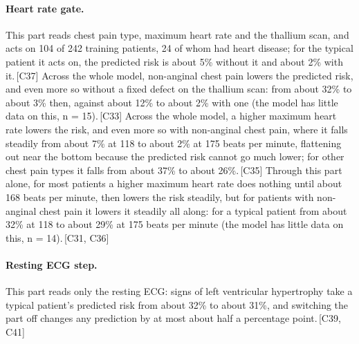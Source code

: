 \documentclass[a4paper,10pt]{article}
\newif\ifreviewmarks
\newcommand{\reviewrule}{\noindent{\color{BrickRed}\rule{\linewidth}{0.8pt}}}
\newenvironment{drafted}[1][]{%
  \ifreviewmarks\par\addvspace{\medskipamount}\reviewrule\par\nopagebreak
  \noindent{\color{BrickRed}\sffamily\footnotesize\textbf{Thesis Draft}\quad #1\hfill review}\par\nopagebreak\smallskip\fi}{%
  \ifreviewmarks\par\smallskip\noindent{\color{BrickRed}\sffamily\footnotesize end of thesis draft}\par\nopagebreak\reviewrule\par\medskip\fi}
\begin{document}
\begin{drafted}[plain-language layer: heart-s2-c2]
\paragraph{Heart rate gate.} This part reads chest pain type, maximum heart rate and the thallium scan, and acts on 104 of 242 training patients, 24 of whom had heart disease; for the typical patient it acts on, the predicted risk is about 5\% without it and about 2\% with it.\,{\scriptsize\textcolor{NavyBlue}{[C37]}} Across the whole model, non-anginal chest pain lowers the predicted risk, and even more so without a fixed defect on the thallium scan: from about 32\% to about 3\% then, against about 12\% to about 2\% with one (the model has little data on this, n = 15).\,{\scriptsize\textcolor{NavyBlue}{[C33]}} Across the whole model, a higher maximum heart rate lowers the risk, and even more so with non-anginal chest pain, where it falls steadily from about 7\% at 118 to about 2\% at 175 beats per minute, flattening out near the bottom because the predicted risk cannot go much lower; for other chest pain types it falls from about 37\% to about 26\%.\,{\scriptsize\textcolor{NavyBlue}{[C35]}} Through this part alone, for most patients a higher maximum heart rate does nothing until about 168 beats per minute, then lowers the risk steadily, but for patients with non-anginal chest pain it lowers it steadily all along: for a typical patient from about 32\% at 118 to about 29\% at 175 beats per minute (the model has little data on this, n = 14).\,{\scriptsize\textcolor{NavyBlue}{[C31, C36]}}
\paragraph{Resting ECG step.} This part reads only the resting ECG: signs of left ventricular hypertrophy take a typical patient's predicted risk from about 32\% to about 31\%, and switching the part off changes any prediction by at most about half a percentage point.\,{\scriptsize\textcolor{NavyBlue}{[C39, C41]}}

\end{drafted}
\end{document}
